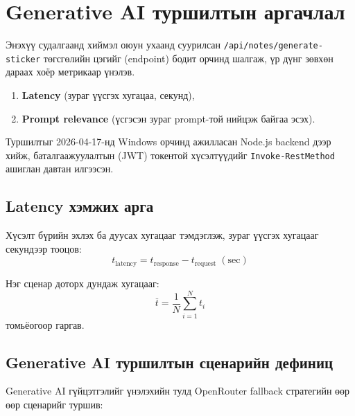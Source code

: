 \section{Generative AI туршилтын аргачлал}

Энэхүү судалгаанд хиймэл оюун ухаанд суурилсан \texttt{/api/notes/generate-sticker} төгсгөлийн цэгийг (endpoint) бодит орчинд шалгаж, үр дүнг зөвхөн дараах хоёр метрикаар үнэлэв.

\begin{enumerate}
    \item \textbf{Latency} (зураг үүсгэх хугацаа, секунд),
    \item \textbf{Prompt relevance} (үсгэсэн зураг prompt-той нийцэж байгаа эсэх).
\end{enumerate}

Туршилтыг 2026-04-17-нд Windows орчинд ажилласан Node.js backend дээр хийж, баталгаажуулалтын (JWT) токентой хүсэлтүүдийг \texttt{Invoke-RestMethod} ашиглан давтан илгээсэн.

\subsection*{Latency хэмжих арга}

Хүсэлт бүрийн эхлэх ба дуусах хугацааг тэмдэглэж, зураг үүсгэх хугацааг секундээр тооцов:
\begin{equation}
\label{eq:latency}
t_{\mathrm{latency}} = t_{\mathrm{response}} - t_{\mathrm{request}}\; (\mathrm{sec})
\end{equation}

Нэг сценар доторх дундаж хугацааг:
\begin{equation}
\label{eq:mean_latency}
\overline{t} = \frac{1}{N}\sum_{i=1}^{N} t_i
\end{equation}
томьёогоор гаргав.

\subsection*{Generative AI туршилтын сценарийн дефиниц}

Generative AI гүйцэтгэлийг үнэлэхийн тулд OpenRouter fallback стратегийн өөр өөр сценарийг туршив:

